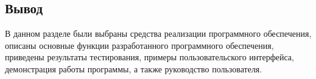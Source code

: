 \newpage

\subsection*{Вывод}

В данном разделе были выбраны средства реализации программного обеспечения, описаны основные функции разработанного программного обеспечения, приведены результаты тестирования, примеры пользовательского интерфейса, демонстрация работы программы, а также руководство пользователя.

